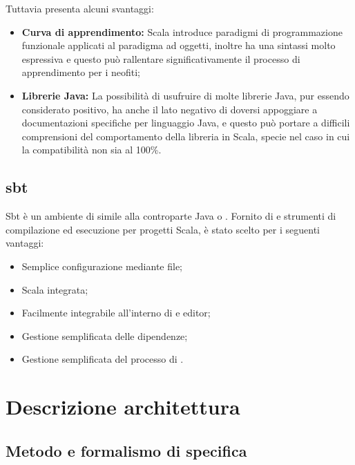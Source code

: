 \documentclass{scalatekids-article}
\begin{document}
Tuttavia presenta alcuni svantaggi:

\begin{itemize}
\item\textbf{Curva di apprendimento:} Scala introduce paradigmi di programmazione funzionale
  applicati al paradigma ad oggetti, inoltre ha una sintassi molto espressiva e questo può
  rallentare significativamente il processo di apprendimento per i neofiti;
\item\textbf{Librerie Java:} La possibilità di usufruire di molte librerie Java, pur essendo
  considerato positivo, ha anche il lato negativo di doversi appoggiare a documentazioni specifiche
  per linguaggio Java, e questo può portare a difficili comprensioni del comportamento della libreria
  in Scala, specie nel caso in cui la compatibilità non sia al 100\%.
\end{itemize}

\subsection{sbt}

Sbt è un ambiente di  simile alla controparte Java  o
. Fornito di  e strumenti di compilazione ed
esecuzione per progetti Scala, è stato scelto per i seguenti vantaggi:
\begin{itemize}
\item Semplice configurazione mediante file;
\item {} Scala integrata;
\item Facilmente integrabile all'interno di  e editor;
\item Gestione semplificata delle dipendenze;
\item Gestione semplificata del processo di .
\end{itemize}

\section{Descrizione architettura}

\subsection{Metodo e formalismo di specifica}
\end{document}
